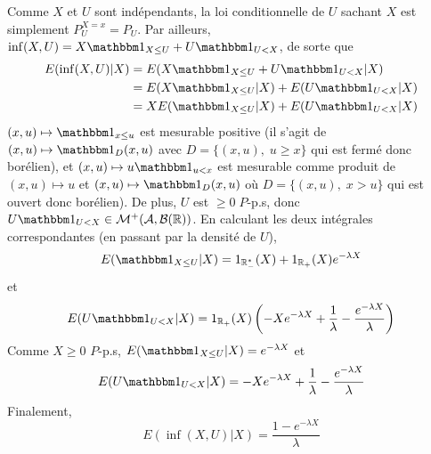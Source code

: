 \documentclass{report}
\begin{document}
\subsection{} \noindent{}\\ 
\\ 
\\
\noindent Comme $X$ et $U$ sont indépendants, la loi conditionnelle de $U$ sachant $X$ est simplement $P_U^{X=x}=P_U$.\newline
Par ailleurs, $\inf(X,U) = X \mathbbm 1_{X\leq U} + U\mathbbm 1_{U<X}$, de sorte que $$\begin{aligned}[t] E(\inf(X,U)|X) &= E(X \mathbbm 1_{X\leq U} + U\mathbbm 1_{U<X}|X)\\
&= E(X \mathbbm 1_{X\leq U}|X) + E(U\mathbbm 1_{U<X}|X) \\
&= X E(\mathbbm 1_{X\leq U}|X) + E(U\mathbbm 1_{U<X}|X)
\end{aligned}$$
$(x,u)\mapsto \mathbbm 1_{x\leq u}$ est mesurable positive (il s'agit de $(x,u)\mapsto \mathbbm 1_D(x,u)$ avec $D=\{(x,u),\; u\geq x\}$ qui est fermé donc borélien), et $(x,u)\mapsto u\mathbbm 1_{u<x}$ est mesurable comme produit de $(x,u)\mapsto u$ et $(x,u)\mapsto \mathbbm 1_{D}(x,u)$ où $D=\{(x,u),\; x>u\}$ qui est ouvert donc borélien). De plus, $U$ est $\geq 0\; P$-p.s, donc $U\mathbbm 1_{U<X}\in \mathcal M^+(\mathcal A, \mathcal B(\mathbb R))$.  En calculant les deux intégrales correspondantes (en passant par la densité de $U$), $$E(\mathbbm 1_{X\leq U}|X) = 1_{\mathbb R_-^*}(X) + 1_{\mathbb R_+}(X)e^{-\lambda X}$$ et $$E(U\mathbbm 1_{U<X}|X) = 1_{\mathbb R_+}(X)\left(-Xe^{-\lambda X}+\frac{1}{\lambda}-\frac{e^{-\lambda X}}{\lambda}\right)$$
Comme $X\geq 0$ $P$-p.s, $E(\mathbbm 1_{X\leq U}|X) = e^{-\lambda X}$ et $$E(U\mathbbm 1_{U<X}|X) =-Xe^{-\lambda X}+\frac{1}{\lambda}-\frac{e^{-\lambda X}}{\lambda}$$
Finalement, $$E(\inf(X,U)|X) = \frac{1-e^{-\lambda X}}{\lambda}$$
\end{document}
